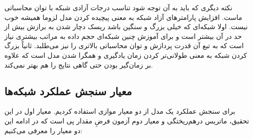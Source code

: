 نکته دیگری که باید به آن توجه شود تناسب درجات آزادی شبکه با توان محاسباتی ماست. افزایش پارامترهای آزاد شبکه به معنی پیچیده کردن مدل لزوما همیشه خوب نیست. اولا شبکه‌ای که خیلی بزرگ و سنگین باشد ریسک دچار شدن به برازش بیش از حد در آن بیشتر است و برای آموزش چنین شبکه‌ای حجم داده به مراتب بیشتری نیاز است که به تبع آن قدرت پردازش و توان محاسباتی بالاتری را نیز می‌طلبد. ثانیاً بزرگ کردن شبکه به معنی طولانی‌تر کردن زمان یادگیری و همگرا شدن مدل است که علاوه بر زمان‌گیر بودن حتی گاهی نتایج را هم بهتر نمی‌کند.



\subsection{معیار سنجش عملکرد شبکه‌ها}
برای سنجش عملکرد یک مدل از دو معیار موازی استفاده کردیم. معیار اول در این تحقیق، ماتریس درهم‌ریختگی
و معیار دوم آزمون فرضِ مقدار پی
است که در ادامه این دو معیار را معرفی می‌کنیم:

